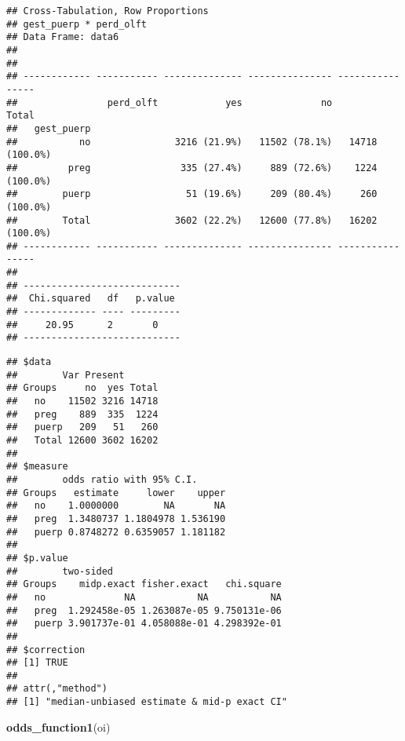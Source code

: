\documentclass[
]{article}
\newenvironment{Shaded}{\begin{snugshade}}{\end{snugshade}}
\newcommand{\KeywordTok}[1]{\textcolor[rgb]{0.13,0.29,0.53}{\textbf{#1}}}
\newcommand{\NormalTok}[1]{#1}
\newcommand{\OperatorTok}[1]{\textcolor[rgb]{0.81,0.36,0.00}{\textbf{#1}}}
\newcommand{\StringTok}[1]{\textcolor[rgb]{0.31,0.60,0.02}{#1}}
\begin{document}
\begin{verbatim}
## Cross-Tabulation, Row Proportions  
## gest_puerp * perd_olft  
## Data Frame: data6  
## 
## 
## ------------ ----------- -------------- --------------- ----------------
##                perd_olft            yes              no            Total
##   gest_puerp                                                            
##           no               3216 (21.9%)   11502 (78.1%)   14718 (100.0%)
##         preg                335 (27.4%)     889 (72.6%)    1224 (100.0%)
##        puerp                 51 (19.6%)     209 (80.4%)     260 (100.0%)
##        Total               3602 (22.2%)   12600 (77.8%)   16202 (100.0%)
## ------------ ----------- -------------- --------------- ----------------
## 
## ----------------------------
##  Chi.squared   df   p.value 
## ------------- ---- ---------
##     20.95      2       0    
## ----------------------------
\end{verbatim}

\begin{Shaded}
\end{Shaded}

\begin{verbatim}
## $data
##        Var Present
## Groups     no  yes Total
##   no    11502 3216 14718
##   preg    889  335  1224
##   puerp   209   51   260
##   Total 12600 3602 16202
## 
## $measure
##        odds ratio with 95% C.I.
## Groups   estimate     lower    upper
##   no    1.0000000        NA       NA
##   preg  1.3480737 1.1804978 1.536190
##   puerp 0.8748272 0.6359057 1.181182
## 
## $p.value
##        two-sided
## Groups    midp.exact fisher.exact   chi.square
##   no              NA           NA           NA
##   preg  1.292458e-05 1.263087e-05 9.750131e-06
##   puerp 3.901737e-01 4.058088e-01 4.298392e-01
## 
## $correction
## [1] TRUE
## 
## attr(,"method")
## [1] "median-unbiased estimate & mid-p exact CI"
\end{verbatim}

\begin{Shaded}
\begin{Highlighting}[]
\KeywordTok{odds_function1}\NormalTok{(oi)}
\end{Highlighting}
\end{Shaded}
\end{document}
